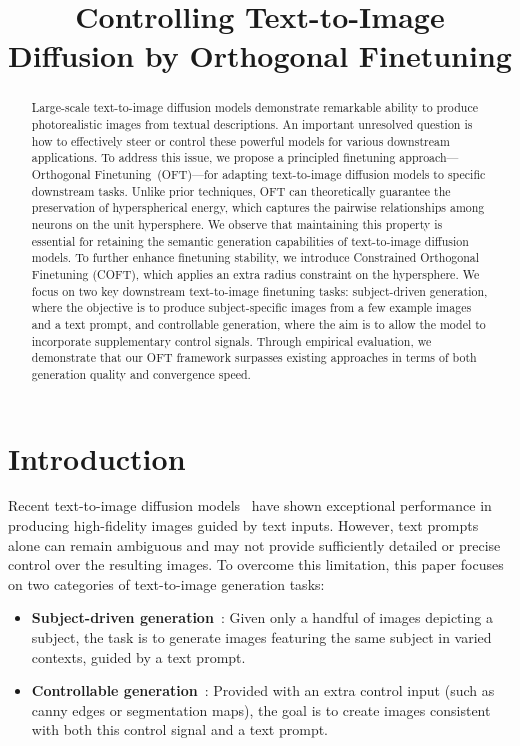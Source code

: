 \title{Controlling Text-to-Image Diffusion by Orthogonal Finetuning}

\begin{abstract}
Large-scale text-to-image diffusion models demonstrate remarkable ability to produce photorealistic images from textual descriptions. An important unresolved question is how to effectively steer or control these powerful models for various downstream applications. To address this issue, we propose a principled finetuning approach—Orthogonal Finetuning~(OFT)—for adapting text-to-image diffusion models to specific downstream tasks. Unlike prior techniques, OFT can theoretically guarantee the preservation of hyperspherical energy, which captures the pairwise relationships among neurons on the unit hypersphere. We observe that maintaining this property is essential for retaining the semantic generation capabilities of text-to-image diffusion models. To further enhance finetuning stability, we introduce Constrained Orthogonal Finetuning (COFT), which applies an extra radius constraint on the hypersphere. We focus on two key downstream text-to-image finetuning tasks: subject-driven generation, where the objective is to produce subject-specific images from a few example images and a text prompt, and controllable generation, where the aim is to allow the model to incorporate supplementary control signals. Through empirical evaluation, we demonstrate that our OFT framework surpasses existing approaches in terms of both generation quality and convergence speed.
\end{abstract}

\section{Introduction}

Recent text-to-image diffusion models~\cite{saharia2022photorealistic,ramesh2022hierarchical,rombach2022high} have shown exceptional performance in producing high-fidelity images guided by text inputs. However, text prompts alone can remain ambiguous and may not provide sufficiently detailed or precise control over the resulting images. To overcome this limitation, this paper focuses on two categories of text-to-image generation tasks:

\begin{itemize}[leftmargin=*,nosep]

    \item \textbf{Subject-driven generation}~\cite{ruiz2023dreambooth}: Given only a handful of images depicting a subject, the task is to generate images featuring the same subject in varied contexts, guided by a text prompt.
    \item \textbf{Controllable generation}~\cite{zhang2023adding,mou2023t2i}: Provided with an extra control input (such as canny edges or segmentation maps), the goal is to create images consistent with both this control signal and a text prompt.
\end{itemize}

